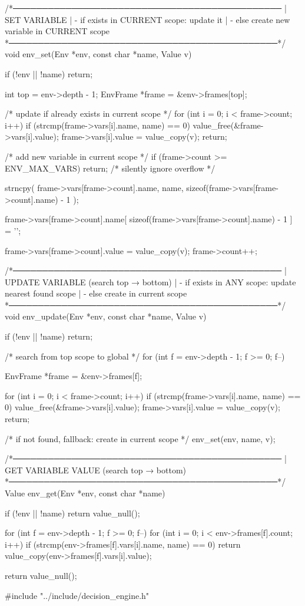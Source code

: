 \documentclass{article}
\begin{document}
/*──────────────────────────────────────────────
 | SET VARIABLE
 | - if exists in CURRENT scope: update it
 | - else create new variable in CURRENT scope
 *──────────────────────────────────────────────*/
void env_set(Env *env, const char *name, Value v)
{
    if (!env || !name) return;

    int top = env->depth - 1;
    EnvFrame *frame = &env->frames[top];

    /* update if already exists in current scope */
    for (int i = 0; i < frame->count; i++) {
        if (strcmp(frame->vars[i].name, name) == 0) {
            value_free(&frame->vars[i].value);
            frame->vars[i].value = value_copy(v);
            return;
        }
    }

    /* add new variable in current scope */
    if (frame->count >= ENV_MAX_VARS) {
        return; /* silently ignore overflow */
    }

    strncpy(
        frame->vars[frame->count].name,
        name,
        sizeof(frame->vars[frame->count].name) - 1
    );

    frame->vars[frame->count].name[
        sizeof(frame->vars[frame->count].name) - 1
    ] = '\0';

    frame->vars[frame->count].value = value_copy(v);
    frame->count++;
}

/*──────────────────────────────────────────────
 | UPDATE VARIABLE (search top → bottom)
 | - if exists in ANY scope: update nearest found scope
 | - else create in current scope
 *──────────────────────────────────────────────*/
void env_update(Env *env, const char *name, Value v)
{
    if (!env || !name) return;

    /* search from top scope to global */
    for (int f = env->depth - 1; f >= 0; f--) {
        EnvFrame *frame = &env->frames[f];

        for (int i = 0; i < frame->count; i++) {
            if (strcmp(frame->vars[i].name, name) == 0) {
                value_free(&frame->vars[i].value);
                frame->vars[i].value = value_copy(v);
                return;
            }
        }
    }

    /* if not found, fallback: create in current scope */
    env_set(env, name, v);
}

/*──────────────────────────────────────────────
 | GET VARIABLE VALUE (search top → bottom)
 *──────────────────────────────────────────────*/
Value env_get(Env *env, const char *name)
{
    if (!env || !name) return value_null();

    for (int f = env->depth - 1; f >= 0; f--) {
        for (int i = 0; i < env->frames[f].count; i++) {
            if (strcmp(env->frames[f].vars[i].name, name) == 0) {
                return value_copy(env->frames[f].vars[i].value);
            }
        }
    }

    return value_null();
}
#include "../include/decision_engine.h"
\end{document}
